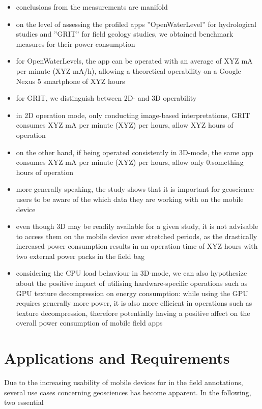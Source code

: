\documentclass[review]{elsarticle}
\begin{document}
\begin{itemize}
\item conclusions from the measurements are manifold
\item on the level of assessing the profiled apps ''OpenWaterLevel'' for hydrological studies and ''\gls{GRIT}'' for field geology studies, we obtained benchmark measures for their power consumption
\item for OpenWaterLevels, the app can be operated with an average of XYZ mA per minute (XYZ mA/h), allowing a theoretical operability on a Google Nexus 5 smartphone of XYZ hours
\item for \gls{GRIT}, we distinguish between 2D- and 3D operability
\item in 2D operation mode, only conducting image-based interpretations, \gls{GRIT} consumes XYZ mA per minute (XYZ) per hours, allow XYZ hours of operation
\item on the other hand, if being operated consistently in 3D-mode, the same app consumes XYZ mA per minute (XYZ) per hours, allow only 0.something hours of operation
\item more generally speaking, the study shows that it is important for geoscience users to be aware of the which data they are working with on the mobile device
\item even though 3D may be readily available for a given study, it is not advisable to access them on the mobile device over stretched periods, as the drastically increased power consumption results in an operation time of XYZ hours with two external power packs in the field bag
\item considering the \gls{CPU} load behaviour in 3D-mode, we can also hypothesize about the positive impact of utilising hardware-specific operations such as \gls{GPU} texture decompression on energy consumption: while using the \gls{GPU} requires generally more power, it is also more efficient in operations such as texture decompression, therefore potentially having a positive affect on the overall power consumption of mobile field apps
\end{itemize}

\section{Applications and Requirements}
\label{sec:applications}
Due to the increasing usability of mobile devices for in the field annotations, several use cases concerning geosciences has become apparent. In the following, two essential 
\end{document}

